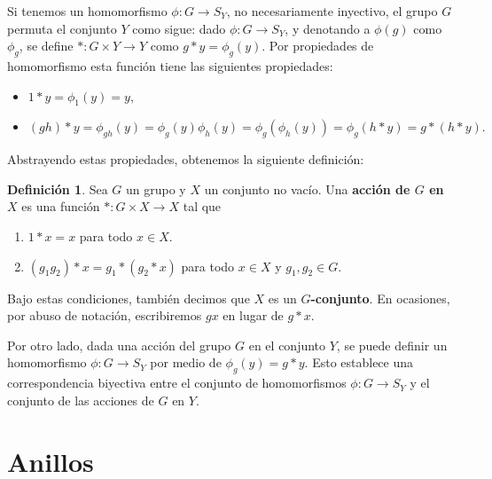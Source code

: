\documentclass[12pt]{book}
\theoremstyle{definition}
\newtheorem{definition}[theorem]{Definición}
\newcounter{in}
\newcounter{ini}
\begin{document}
Si tenemos un homomorfismo $\phi:G\rightarrow S_{Y}$, no
necesariamente inyectivo, el grupo $G$ permuta el conjunto $Y$ como sigue: dado
$\phi:G\rightarrow S_{Y}$, y denotando a $\phi(g)$ como $\phi_{g}$, se define $*:G\times Y\rightarrow Y$ como
$g*y=\phi_{g}(y)$. Por propiedades de homomorfismo esta función tiene las
siguientes propiedades:
\begin{itemize}
\item $1*y=\phi_{1}(y)=y,$
\item $(gh)*y=\phi_{gh}(y)=\phi_{g}(y)\phi_{h}(y)=\phi_{g}(\phi_{h}(y))=\phi_{g}(h*y)=g*(h*y).$
\end{itemize}

Abstrayendo estas propiedades, obtenemos la siguiente definición:

\begin{definition}
  \label{accion-grupo}
  Sea $G$ un grupo y $X$ un conjunto no vacío. Una  \textbf{acción de $G$
  en $X$} es una función $*:G \times X \rightarrow X$ tal que
\begin{enumerate}
\item $1*x=x$ para todo $x\in X.$
\item $(g_{1}g_{2})*x=g_{1}*(g_{2}*x)$ para todo $x\in X$ y $g_{1},g_{2}\in G.$
\end{enumerate}
   Bajo estas condiciones, también decimos que $X$ es un \textbf{$G$-conjunto}.
   En ocasiones, por abuso de notación, escribiremos $gx$ en lugar de $g*x$.
\end{definition}


Por otro lado, dada una acción del grupo $G$ en el conjunto $Y$, se
puede definir un homomorfismo $\phi:G\rightarrow S_{Y}$ por medio de
$\phi_{g}(y)=g*y$. Esto establece una correspondencia biyectiva entre
el conjunto de homomorfismos $\phi:G\rightarrow S_{Y}$ y el conjunto
de las acciones de $G$ en $Y$.

\section{Anillos}
\label{anillos}
\end{document}
